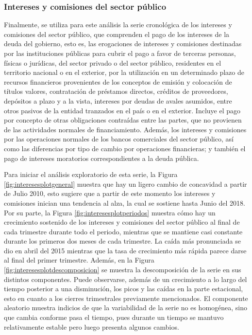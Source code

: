 \documentclass[
]{article}
\begin{document}
\subsubsection{Intereses y comisiones del sector público}

Finalmente, se utiliza para este análisis la serie cronológica de los
intereses y comisiones del sector público, que comprenden el pago de los
intereses de la deuda del gobierno, esto es, las erogaciones de
intereses y comisiones destinadas por las instituciones públicas para
cubrir el pago a favor de terceras personas, físicas o jurídicas, del
sector privado o del sector público, residentes en el territorio
nacional o en el exterior, por la utilización en un determinado plazo de
recursos financieros provenientes de los conceptos de emisión y
colocación de títulos valores, contratación de préstamos directos,
créditos de proveedores, depósitos a plazo y a la vista, intereses por
deudas de avales asumidos, entre otros pasivos de la entidad tranzados
en el país o en el exterior. Incluye el pago por concepto de otras
obligaciones contraídas entre las partes, que no provienen de las
actividades normales de financiamiento. Además, los intereses y
comisiones por las operaciones normales de los bancos comerciales del
sector público, así como las diferencias por tipo de cambio por
operaciones financieras; y también el pago de intereses moratorios
correspondientes a la deuda pública.

Para iniciar el análisis exploratorio de esta serie, la Figura
\ref{fig:interesesplotgeneral} muestra que hay un ligero cambio de
concavidad a partir de Julio 2010, esto sugiere que a partir de este
momento los intereses y comisiones inician una tendencia al alza, la
cual se sostiene hasta Junio del 2018. Por su parte, la Figura
\ref{fig:interesesplotperiodos} muestra cómo hay un crecimiento
sostenido de los intereses y comisiones del sector público al final de
cada trimestre durante todo el periodo, mientras que se mantiene casi
constante durante los primeros dos meses de cada trimestre. La caída más
pronunciada se dio en abril del 2015 mientras que la tasa de crecimiento
más rápida parece darse al final del primer trimestre. Además, en la
Figura \ref{fig:interesesplotdescomposicion} se muestra la
descomposición de la serie en sus distintos componentes. Puede
observarse, además de un crecimiento a lo largo del tiempo posterior a
una disminución, los picos y las caídas en la parte estacional, esto en
cuanto a los cierres trimestrales previamente mencionados. El componente
aleatorio muestra indicios de que la variabilidad de la serie no es
homogénea, sino que cambia conforme pasa el tiempo, pues durante un
tiempo se mantuvo relativamente estable pero luego presenta algunos
cambios.
\end{document}

